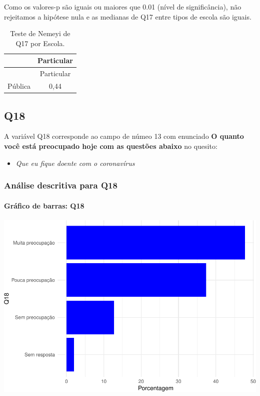 \documentclass[]{article}
\providecommand{\tightlist}{%
  \setlength{\itemsep}{0pt}\setlength{\parskip}{0pt}}
\let\oldparagraph\paragraph
\renewcommand{\paragraph}[1]{\oldparagraph{#1}\mbox{}}
\begin{document}
Como os valores-p são iguais ou maiores que 0.01 (nível de significância), não rejeitamos a hipótese nula e as medianas de Q17 entre tipos de escola são iguais.

\begin{longtable}[]{@{}lc@{}}
\caption{\label{tab:unnamed-chunk-238}Teste de Nemeyi de Q17 por Escola.}\tabularnewline
\toprule
& Particular\tabularnewline
\midrule
\endfirsthead
\toprule
& Particular\tabularnewline
\midrule
\endhead
Pública & 0,44\tabularnewline
\bottomrule
\end{longtable}

\cleardoublepage

\hypertarget{q18}{%
\subsection{Q18}\label{q18}}

A variável Q18 corresponde ao campo de númeo 13 com enunciado \textbf{O quanto você está preocupado hoje com as questões abaixo} no quesito:

\begin{itemize}
\tightlist
\item
  \emph{Que eu fique doente com o coronavírus}
\end{itemize}

\hypertarget{anuxe1lise-descritiva-para-q18}{%
\subsubsection{Análise descritiva para Q18}\label{anuxe1lise-descritiva-para-q18}}

\hypertarget{gruxe1fico-de-barras-q18}{%
\paragraph{Gráfico de barras: Q18}\label{gruxe1fico-de-barras-q18}}

\begin{center}\includegraphics[width=0.75\linewidth]{relatorio_covid19_files/figure-latex/unnamed-chunk-245-1} \end{center}
\end{document}
